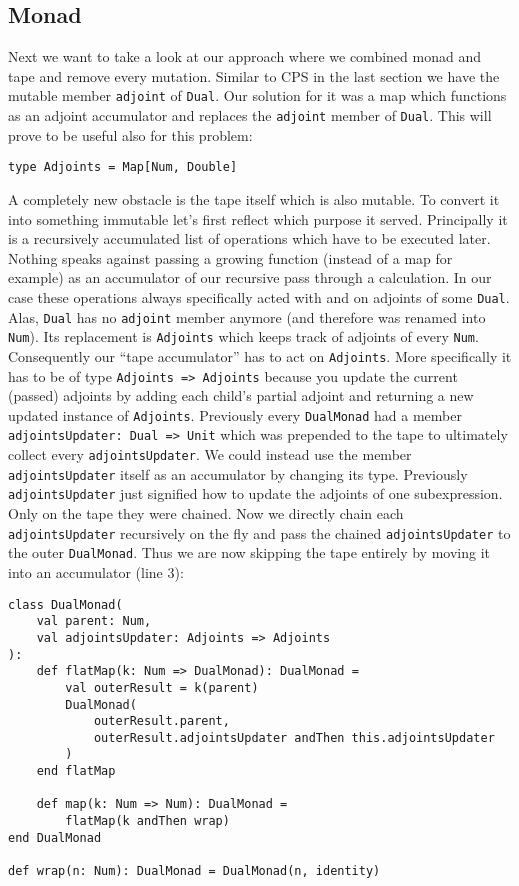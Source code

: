 \subsection{Monad} \label{sec:functionalMonad}

Next we want to take a look at our approach where we combined monad and tape and remove every mutation. Similar to CPS in the last section we have the mutable member \lstinline{adjoint} of \lstinline{Dual}. Our solution for it was a map which functions as an adjoint accumulator and replaces the \lstinline{adjoint} member of \lstinline{Dual}. This will prove to be useful also for this problem:
\begin{lstlisting}
type Adjoints = Map[Num, Double]
\end{lstlisting}

A completely new obstacle is the tape itself which is also mutable. To convert it into something immutable let's first reflect which purpose it served. Principally it is a recursively accumulated list of operations which have to be executed later. Nothing speaks against passing a growing function (instead of a map for example) as an accumulator of our recursive pass through a calculation. In our case these operations always specifically acted with and on adjoints of some \lstinline{Dual}. Alas, \lstinline{Dual} has no \lstinline{adjoint} member anymore (and therefore was renamed into \lstinline{Num}). Its replacement is \lstinline{Adjoints} which keeps track of adjoints of every \lstinline{Num}. Consequently our ``tape accumulator'' has to act on \lstinline{Adjoints}. More specifically it has to be of type \lstinline{Adjoints => Adjoints} because you update the current (passed) adjoints by adding each child's partial adjoint and returning a new updated instance of \lstinline{Adjoints}. Previously every \lstinline{DualMonad} had a member \lstinline{adjointsUpdater: Dual => Unit} which was prepended to the tape to ultimately collect every \lstinline{adjointsUpdater}. We could instead use the member \lstinline{adjointsUpdater} itself as an accumulator by changing its type. Previously \lstinline{adjointsUpdater} just signified how to update the adjoints of one subexpression. Only on the tape they were chained. Now we directly chain each \lstinline{adjointsUpdater} recursively on the fly and pass the chained \lstinline{adjointsUpdater} to the outer \lstinline{DualMonad}. Thus we are now skipping the tape entirely by moving it into an accumulator (line 3):
\begin{lstlisting}
class DualMonad(
    val parent: Num, 
    val adjointsUpdater: Adjoints => Adjoints
):
    def flatMap(k: Num => DualMonad): DualMonad =
        val outerResult = k(parent)
        DualMonad(
            outerResult.parent, 
            outerResult.adjointsUpdater andThen this.adjointsUpdater 
        )
    end flatMap

    def map(k: Num => Num): DualMonad =
        flatMap(k andThen wrap)
end DualMonad

def wrap(n: Num): DualMonad = DualMonad(n, identity)
\end{lstlisting}
